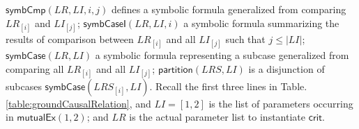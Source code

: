 \documentclass{llncs}
\def \iInv {iInv}
\def \iR {iR}
\begin{document}
$\mathsf{symbCmp}(LR,LI,i,j)$ defines a symbolic formula  generalized from comparing $LR_{[i]}$ and $LI_{[j]}$; $\mathsf{symbCaseI}(LR,LI,i)$  a symbolic formula summarizing the results of comparison  between $LR_{[i]}$  and all $LI_{[j]}$ such that $j \le |LI|$; $\mathsf{symbCase}(LR,LI )$ a symbolic formula representing a subcase generalized from comparing all $LR_{[i]}$  and all $LI_{[j]}$; $\mathsf{partition}(LRS,LI)$  is a disjunction of subcases $\mathsf{symbCase}(LRS_{[i]},LI )$.  Recall the first three lines in Table. \ref{table:groundCausalRelation}, and $LI=[1,2]$ is the list of parameters occurring in $\mathsf{mutualEx}(1,2)$; and $LR$ is the actual parameter list to instantiate $\mathsf{crit}$.

\end{document}

